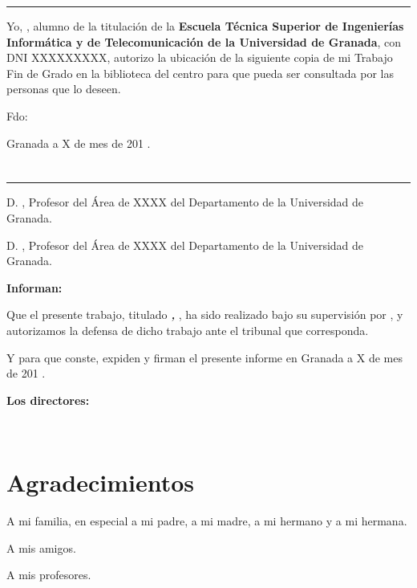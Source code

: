 \noindent\rule[-1ex]{\textwidth}{2pt}\bigskip\bigskip\bigskip

Yo, \textbf\myName, alumno de la titulación \myDegree de la \textbf{Escuela Técnica Superior
de Ingenierías Informática y de Telecomunicación de la Universidad de Granada}, con DNI XXXXXXXXX, autorizo la
ubicación de la siguiente copia de mi Trabajo Fin de Grado en la biblioteca del centro para que pueda ser
consultada por las personas que lo deseen.

\vspace{6cm}

\noindent Fdo: \myName

\vspace{2cm}

\begin{flushright}
Granada a X de mes de 201 .
\end{flushright}


\chapter*{}
\thispagestyle{empty}

\noindent\rule[-1ex]{\textwidth}{2pt}\bigskip\bigskip\bigskip

D. \textbf\myProf, Profesor del Área de XXXX del Departamento \myDepartment de la Universidad de Granada.

\vspace{0.5cm}

D. \textbf\myOtherProf, Profesor del Área de XXXX del Departamento \myDepartment de la Universidad de Granada.


\vspace{0.5cm}

\textbf{Informan:}

\vspace{0.5cm}

Que el presente trabajo, titulado \textit{\textbf{\myTitle, \mySubTitle}},
ha sido realizado bajo su supervisión por \textbf{\myName}, y autorizamos la defensa de dicho trabajo ante el tribunal
que corresponda.

\vspace{0.5cm}

Y para que conste, expiden y firman el presente informe en Granada a X de mes de 201 .

\vspace{1cm}

\textbf{Los directores:}

\vspace{5cm}

\noindent \textbf{\myProf \ \ \ \ \ \myOtherProf}

\chapter*{Agradecimientos}
\thispagestyle{empty}

       \vspace{1cm}


A mi familia, en especial a mi padre, a mi madre, a mi hermano y a mi hermana. 

A mis amigos.

A mis profesores.

